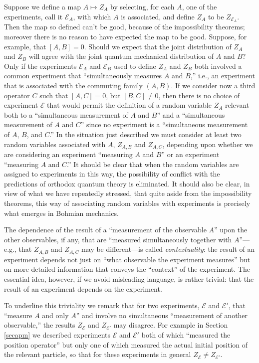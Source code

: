 \documentclass[12pt]{article}
\newcommand{\BM}{Bohmian mechanics}
\newcommand{\E}{\mbox{$\mathscr{E}$}}
\newcommand{\oqt}{orthodox quantum theory}
\begin{document}
Suppose we define a map $A\mapsto{}Z_A$ by selecting, for each $A$,
one of the experiments, call it $\E_A$, with which $A$ is associated,
and define $Z_A$ to be $Z_{\E_A}$. Then the map so defined can't be
good, because of the impossibility theorems; moreover there is no
reason to have expected the map to be good. Suppose, for example, that
$[A,B]=0$. Should we expect that the joint distribution of $Z_A$ and
$Z_B$ will agree with the joint quantum mechanical distribution of $A$
and $B$? Only if the experiments $\E_A$ and $\E_B$ used to define
$Z_A$ and $Z_B$ both involved a common experiment that
``simultaneously measures $A$ and $B$,'' i.e., an experiment that is
associated with the commuting family $(A,B)$. If we consider now a
third operator $C$ such that $[A,C]=0$, but $[B,C]\neq 0$, then there
is no choice of experiment \E{} that would permit the definition of a
random variable $Z_A$ relevant both to a ``simultaneous measurement of
$A$ and $B$'' and a ``simultaneous measurement of $A$ and $C$'' since
no experiment is a ``simultaneous measurement of $A$, $B$, and $C$.''
In the situation just described we must consider at least two random
variables associated with $A$, $Z_{A,B}$ and $Z_{A,C}$, depending upon
whether we are considering an experiment ``measuring $A$ and $B$'' or
an experiment ``measuring $A$ and $C$.''  It should be clear that when
the random variables are assigned to experiments in this way, the
possibility of conflict with the predictions of \oqt{} is eliminated.
It should also be clear, in view of what we have repeatedly stressed,
that quite aside {}from the impossibility theorems, this way of
associating random variables with experiments is precisely what
emerges in \BM.


The dependence of the result of a ``measurement of the observable
$A$'' upon the other observables, if any, that are ``measured
simultaneously together with $A$''---e.g., that $Z_{A,B}$ and
$Z_{A,C}$ may be different---is called \emph{contextuality}: the
result of an experiment depends not just on ``what observable the
experiment measures'' but on more detailed information that conveys
the ``context'' of the experiment. The essential idea, however, if we
avoid misleading language, is rather trivial: that the result of an
experiment depends on the experiment.

To underline this triviality we remark that for two experiments, $\E$
and $\E'$, that ``measure $A$ and only $A$'' and involve no
simultaneous ``measurement of another observable,'' the results
$Z_{\E}$ and $Z_{\E'}$ may disagree. For example in Section
\ref{secapm} we described experiments $\E$ and $\E'$ both of which
``measured the position operator'' but only one of which measured the
actual initial position of the relevant particle, so that for these
experiments in general $Z_{\E}\neq Z_{\E'}$.
\end{document}
